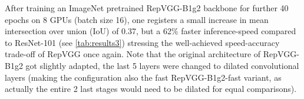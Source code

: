 After training an ImageNet \cite{JiaDeng.2009} pretrained RepVGG-B1g2 backbone for further 40 epochs on 8 GPUs (batch size 16), one registers a small increase in mean intersection over union (IoU) of 0.37, but a 62\% faster inference-speed compared to ResNet-101 (see \autoref{tab:results3}) stressing the well-achieved speed-accuracy trade-off of RepVGG once again. Note that the original architecture of RepVGG-B1g2 got slightly adapted, the last 5 layers were changed to dilated convolutional layers \cite{FisherYu.2016} (making the configuration also the fast RepVGG-B1g2-fast variant, as actually the entire 2 last stages would need to be dilated for equal comparisons). 
